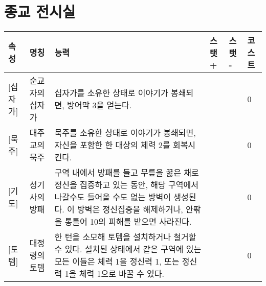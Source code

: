 \documentclass{report}
\begin{document}
	\section*{종교 전시실}
	\begin{tabularx}{\textwidth}{l!{\color{black}\vrule}l!{\color{black}\vrule}X!{\color{black}\vrule}l!{\color{black}\vrule}l!{\color{black}\vrule}l}
		\textbf{속성} & \textbf{명칭} & \textbf{능력} & \textbf{스탯 +} & \textbf{스탯 -} & \textbf{코스트}\\ \hline \hline
		[신성][십자가]& 순교자의 십자가 & 십자가를 소유한 상태로 이야기가 봉쇄되면, 방어막 3을 얻는다. &  & & 0 \\ \hline
		[신성][묵주]& 대주교의 묵주 & 묵주를 소유한 상태로 이야기가 봉쇄되면, 자신을 포함한 한 대상의 체력 2를 회복시킨다. &  & & 0 \\ \hline
		[신성][기도]& 성기사의 방패 & 구역 내에서 방패를 들고 무릎을 꿇은 채로 정신을 집중하고 있는 동안, 해당 구역에서 나갈수도 들어올 수도 없는 방벽이 생성된다. 이 방벽은 정신집중을 해제하거나, 안팎을 통틀어 10의 피해를 받으면 사라진다.  &  & & 0 \\ \hline
		[신성][토템]& 대정령의 토템 & 한 턴을 소모해 토템을 설치하거나 철거할 수 있다. 설치된 상태에서 같은 구역에 있는 모든 이들은 체력 1을 정신력 1, 또는 정신력 1을 체력 1으로 바꿀 수 있다. &  & & 0 \\
	\end{tabularx}
\end{document}

